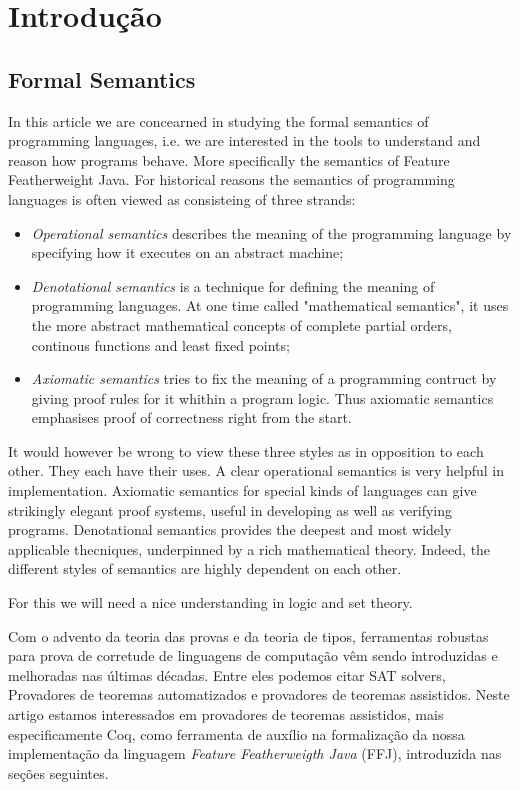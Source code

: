 \chapter{Introdução}


\section{Formal Semantics} In this article we are concearned in studying the
formal semantics of programming languages, i.e. we are interested in the tools
to understand and reason how programs behave. More specifically the semantics of
Feature Featherweight Java.  For historical reasons the semantics of programming
languages is often viewed as consisteing of three strands: 

\begin{itemize} 
    \item \textit{Operational semantics} describes the meaning of the
        programming language by specifying how it executes on an abstract machine;

    \item \textit{Denotational semantics} is a technique for defining the
    meaning of programming languages. At one time called "mathematical
    semantics", it uses the more abstract mathematical concepts of complete
    partial orders, continous functions and least fixed points; 

    \item \textit{Axiomatic semantics} tries to fix the meaning of a programming
        contruct by giving proof rules for it whithin a program logic. Thus
        axiomatic semantics emphasises proof of correctness right from the start.
\end{itemize}

It would however be wrong to view these three styles as in opposition to
each other. They each have their uses. A clear operational semantics is very
helpful in implementation. Axiomatic semantics for special kinds of
languages can give strikingly elegant proof systems, useful in developing as
well as verifying programs. Denotational semantics provides the deepest and
most widely applicable thecniques, underpinned by a rich mathematical
theory. Indeed, the different styles  of semantics are highly dependent on
each other. 

For this we will need a nice understanding in logic and set theory.


Com o advento da teoria das provas e da teoria de tipos\cite{martinlof},
ferramentas robustas para prova de corretude de linguagens de computação vêm
sendo introduzidas e melhoradas nas últimas décadas. Entre eles podemos citar
SAT solvers, Provadores de teoremas automatizados e provadores de teoremas
assistidos.  Neste artigo estamos interessados em provadores de teoremas
assistidos, mais especificamente Coq, como ferramenta de auxílio na formalização
da nossa implementação da linguagem \textit{Feature Featherweigth Java} (FFJ),
introduzida nas seções seguintes. 

